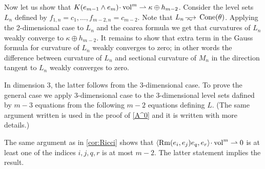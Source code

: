 Now let us show that $K(e_{m-1}\wedge e_m)\cdot\vol^m\rightharpoonup \kappa\oplus h_{m-2}$.
Consider the level sets $L_n$ defined by $f_{1,n}=c_1,\dots,f_{m-2,n}=c_{m-2}$.
Note that $L_n\smooths{} \Cone(\theta)$.
Applying the 2-dimensional case to $L_n$ and the coarea formula we get that curvatures of $L_n$ weakly converge to $\kappa\oplus h_{m-2}$.
It remains to show that extra term in the Gauss formula for curvature of $L_n$ weakly converges to zero; 
in other words the difference between curvature of $L_n$ and sectional curvature of $M_n$ in the direction tangent to $L_n$ weakly converges to zero.

In dimension 3, the latter follows from the 3-dimensional case.
To prove the general case we apply 3-dimensional case to the 3-dimensional level sets dafined by $m-3$ equations from the following $m-2$ equations defining $L$.
(The same argument written is used in the proof of \ref{A^0} and it is written with more details.)

The same argument as in \ref{cor:Ricci} shows that $\langle\Rm(e_i,e_j)e_q,e_r\rangle\cdot\vol^m\rightharpoonup0$ is at least one of the indices $i,j,q,r$ is at most $m-2$.
The latter statement implies the result.
\qeds
